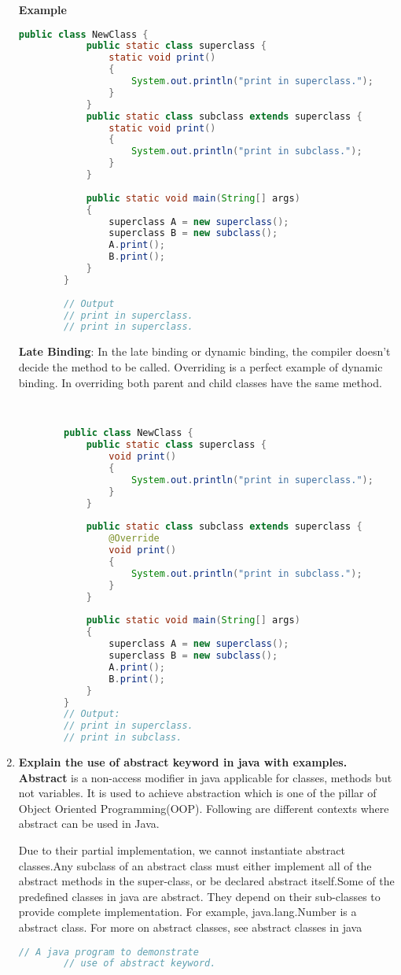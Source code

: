 \documentclass[11pt]{article}
\begin{document}
\begin{enumerate}
	      \textbf{Example}

	      \begin{lstlisting}[language=Java]
		public class NewClass { 
			public static class superclass { 
				static void print() 
				{ 
					System.out.println("print in superclass."); 
				} 
			} 
			public static class subclass extends superclass { 
				static void print() 
				{ 
					System.out.println("print in subclass."); 
				} 
			} 
		  
			public static void main(String[] args) 
			{ 
				superclass A = new superclass(); 
				superclass B = new subclass(); 
				A.print(); 
				B.print(); 
			} 
		} 		
	
		// Output
		// print in superclass.
		// print in superclass.

	\end{lstlisting}

	      \textbf{Late Binding}: In the late binding or dynamic binding, the compiler doesn't decide the method to be called. Overriding is a perfect example of dynamic binding. In overriding both parent and child classes have the same method.

	      \begin{lstlisting}[language=Java]


		public class NewClass { 
			public static class superclass { 
				void print() 
				{ 
					System.out.println("print in superclass."); 
				} 
			} 
		  
			public static class subclass extends superclass { 
				@Override
				void print() 
				{ 
					System.out.println("print in subclass."); 
				} 
			} 
		  
			public static void main(String[] args) 
			{ 
				superclass A = new superclass(); 
				superclass B = new subclass(); 
				A.print(); 
				B.print(); 
			} 
		} 
		// Output: 
		// print in superclass.
		// print in subclass.
	\end{lstlisting}
	\item \textbf{Explain the use of abstract keyword in java with examples.}\\
	      \textbf{Abstract} is a non-access modifier in java applicable for classes, methods but not variables. It is used to achieve abstraction which is one of the pillar of Object Oriented Programming(OOP). Following are different contexts where abstract can be used in Java.

	      Due to their partial implementation, we cannot instantiate abstract classes.Any subclass of an abstract class must either implement all of the abstract methods in the super-class, or be declared abstract itself.Some of the predefined classes in java are abstract. They depend on their sub-classes to provide complete implementation. For example, java.lang.Number is a abstract class. For more on abstract classes, see abstract classes in java
	      \begin{lstlisting}[language=Java]
		// A java program to demonstrate
		// use of abstract keyword.
		

\end{lstlisting}
\end{enumerate}
\end{document}
